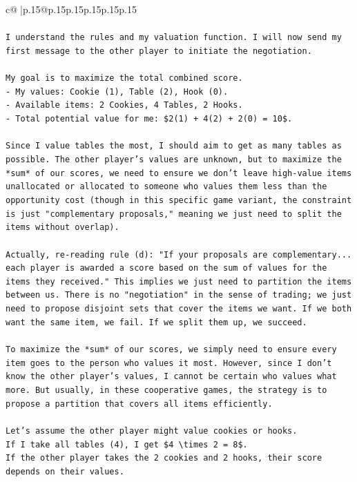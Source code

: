 \documentclass{article}
\begin{document}
{\begin{supertabular}{c@{$\;$}|p{.15\linewidth}@{}p{.15\linewidth}p{.15\linewidth}p{.15\linewidth}p{.15\linewidth}p{.15\linewidth}}
{{{\\ 
\\ 
\texttt{I understand the rules and my valuation function. I will now send my first message to the other player to initiate the negotiation.} \\
\\ 
\texttt{My goal is to maximize the total combined score.} \\
\texttt{{-} My values: Cookie (1), Table (2), Hook (0).} \\
\texttt{{-} Available items: 2 Cookies, 4 Tables, 2 Hooks.} \\
\texttt{{-} Total potential value for me: \$2(1) + 4(2) + 2(0) = 10\$.} \\
\\ 
\texttt{Since I value tables the most, I should aim to get as many tables as possible. The other player's values are unknown, but to maximize the *sum* of our scores, we need to ensure we don't leave high{-}value items unallocated or allocated to someone who values them less than the opportunity cost (though in this specific game variant, the constraint is just "complementary proposals," meaning we just need to split the items without overlap).} \\
\\ 
\texttt{Actually, re{-}reading rule (d): "If your proposals are complementary... each player is awarded a score based on the sum of values for the items they received." This implies we just need to partition the items between us. There is no "negotiation" in the sense of trading; we just need to propose disjoint sets that cover the items we want. If we both want the same item, we fail. If we split them up, we succeed.} \\
\\ 
\texttt{To maximize the *sum* of our scores, we simply need to ensure every item goes to the person who values it most. However, since I don't know the other player's values, I cannot be certain who values what more. But usually, in these cooperative games, the strategy is to propose a partition that covers all items efficiently.} \\
\\ 
\texttt{Let's assume the other player might value cookies or hooks.} \\
\texttt{If I take all tables (4), I get \$4 \textbackslash{}times 2 = 8\$.} \\
\texttt{If the other player takes the 2 cookies and 2 hooks, their score depends on their values.} \\
}}}
\end{supertabular}}
\end{document}
